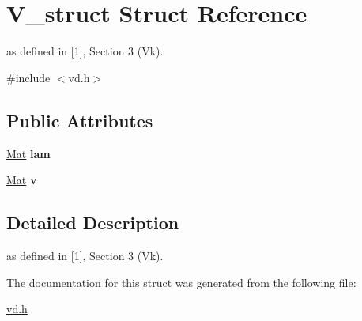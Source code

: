\hypertarget{structV__struct}{}\section{V\+\_\+struct Struct Reference}
\label{structV__struct}


as defined in \mbox{[}1\mbox{]}, Section 3 (Vk).  




{\ttfamily \#include $<$vd.\+h$>$}

\subsection*{Public Attributes}
\begin{DoxyCompactItemize}
\item 
\mbox{\label{structV__struct_a56d1655953ba5bee519bd62d992abfff}} 
\mbox{\hyperlink{typedefs_8cpp_a9fa28c1f74e909474857584f5c7b0088}{Mat}} {\bfseries lam}
\item 
\mbox{\label{structV__struct_aa78c83185af94c1df09f59a689881cd9}} 
\mbox{\hyperlink{typedefs_8cpp_a9fa28c1f74e909474857584f5c7b0088}{Mat}} {\bfseries v}
\end{DoxyCompactItemize}


\subsection{Detailed Description}
as defined in \mbox{[}1\mbox{]}, Section 3 (Vk). 

The documentation for this struct was generated from the following file\+:\begin{DoxyCompactItemize}
\item 
\mbox{\hyperlink{vd_8h}{vd.\+h}}\end{DoxyCompactItemize}
